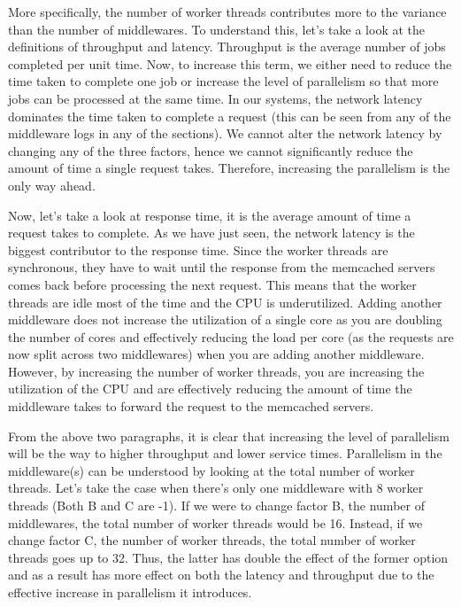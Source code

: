 \documentclass[11pt,a4paper]{article}
\begin{document}
More specifically, the number of worker threads contributes more to the variance than the number of middlewares. To understand this, let's take a look at the definitions of throughput and latency. Throughput is the average number of jobs completed per unit time. Now, to increase this term, we either need to reduce the time taken to complete one job or increase the level of parallelism so that more jobs can be processed at the same time. In our systems, the network latency dominates the time taken to complete a request (this can be seen from any of the middleware logs in any of the sections). We cannot alter the network latency by changing any of the three factors, hence we cannot significantly reduce the amount of time a single request takes. Therefore, increasing the parallelism is the only way ahead.

Now, let's take a look at response time, it is the average amount of time a request takes to complete. As we have just seen, the network latency is the biggest contributor to the response time. Since the worker threads are synchronous, they have to wait until the response from the memcached servers comes back before processing the next request. This means that the worker threads are idle most of the time and the CPU is underutilized. Adding another middleware does not increase the utilization of a single core as you are doubling the number of cores and effectively reducing the load per core (as the requests are now split across two middlewares) when you are adding another middleware. However, by increasing the number of worker threads, you are increasing the utilization of the CPU and are effectively reducing the amount of time the middleware takes to forward the request to the memcached servers.

From the above two paragraphs, it is clear that increasing the level of parallelism will be the way to higher throughput and lower service times. Parallelism in the middleware(s) can be understood by looking at the total number of worker threads. Let's take the case when there's only one middleware with 8 worker threads (Both B and C are -1). If we were to change factor B, the number of middlewares, the total number of worker threads would be 16. Instead, if we change factor C, the number of worker threads, the total number of worker threads goes up to 32. Thus, the latter has double the effect of the former option and as a result has more effect on both the latency and throughput due to the effective increase in parallelism it introduces.
\end{document}
